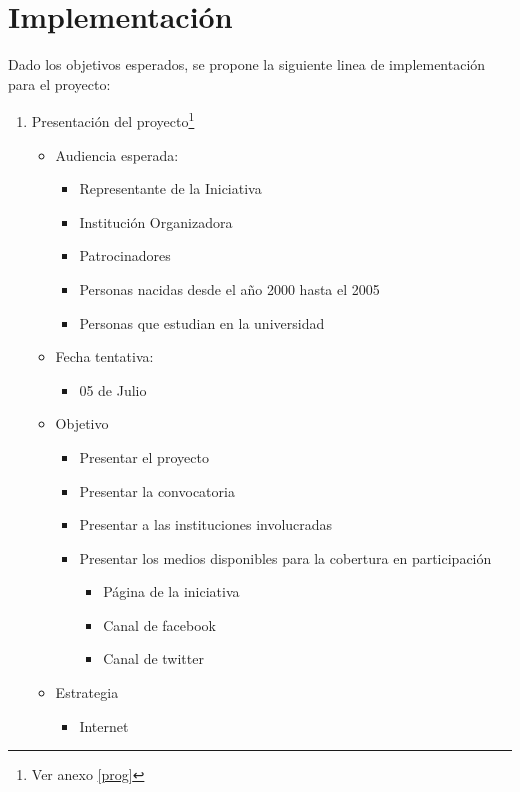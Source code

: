 \documentclass{article}
\begin{document}
\section{Implementación}

Dado los objetivos esperados, se propone la siguiente linea de implementación para el proyecto:

\begin{enumerate}
\item Presentación del proyecto\footnote{Ver anexo \ref{prog}}
\begin{itemize}
\item Audiencia esperada:
\begin{itemize}
\item Representante de la Iniciativa
\item Institución Organizadora
\item Patrocinadores
\item Personas nacidas desde el año 2000 hasta el 2005
\item Personas que estudian en la universidad
\end{itemize}
\item Fecha tentativa:
\begin{itemize}
\item 05 de Julio
\end{itemize}
\item Objetivo
\begin{itemize}
\item Presentar el proyecto
\item Presentar la convocatoria
\item Presentar a las instituciones involucradas
\item Presentar los medios disponibles para la cobertura en participación
\begin{itemize}
\item Página de la iniciativa 
\item Canal de facebook
\item Canal de twitter
\end{itemize}
\end{itemize}
\item Estrategia
\begin{itemize}
\item Internet
\end{itemize}
\end{itemize}


\end{enumerate}
\end{document}
